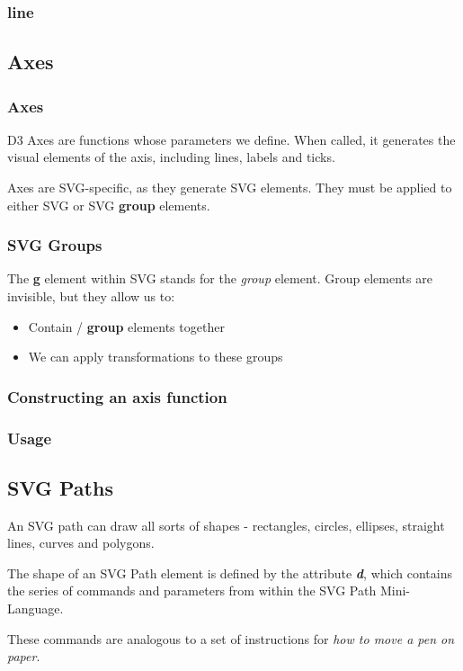 \documentclass[red]{beamer}
\begin{document}
\begin{frame}
  \frametitle{line}
  \lstline
\end{frame}

\subsection{Axes}

\begin{frame}
  \frametitle{Axes}
  D3 Axes are functions whose parameters we define. When called, it generates the visual elements of the axis, including lines, labels and ticks. 
  \newline

  Axes are SVG-specific, as they generate SVG elements. They must be applied to either SVG or SVG \textbf{group} elements. 
\end{frame}

\begin{frame}
  \frametitle{SVG Groups}
  The \textbf{g} element within SVG stands for the \textit{group} element. Group elements are invisible, but they allow us to:
  \begin{itemize}
  \item<1-> Contain / \textbf{group} elements together
  \item<2-> We can apply transformations to these groups
  \end{itemize}
\end{frame}

\begin{frame}
  \frametitle{Constructing an axis function}
  \lstaxis
\end{frame}


\begin{frame}
  \frametitle{Usage}
  \lstcreateaxis
\end{frame}

\subsection{SVG Paths}
\begin{frame}
  An SVG path can draw all sorts of shapes - rectangles, circles, ellipses, straight lines, curves and polygons. 
  \newline

  The shape of an SVG Path element is defined by the attribute \textit{\textbf{d}}, which contains the series of commands and parameters from within the SVG Path Mini-Language. 
  \newline

  These commands are analogous to a set of instructions for \textit{how to move a pen on paper}.
\end{frame}
\end{document}
